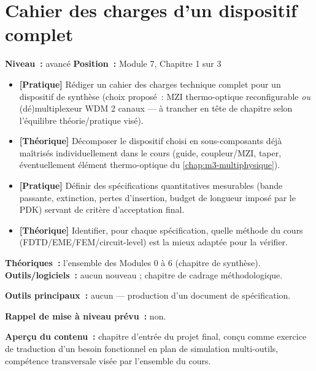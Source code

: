 
\chapter{Cahier des charges d'un dispositif complet}
\label{chap:m7-cahier-des-charges}

\noindent\textbf{Niveau~:} avancé \hfill \textbf{Position~:} Module 7, Chapitre 1 sur 3

\begin{objectifs}
\begin{itemize}[leftmargin=1.4em]
  \item \textbf{[Pratique]} Rédiger un cahier des charges technique complet pour un dispositif de synthèse (choix proposé~: MZI thermo-optique reconfigurable \emph{ou} (dé)multiplexeur WDM 2 canaux — à trancher en tête de chapitre selon l'équilibre théorie/pratique visé).
  \item \textbf{[Théorique]} Décomposer le dispositif choisi en sous-composants déjà maîtrisés individuellement dans le cours (guide, coupleur/MZI, taper, éventuellement élément thermo-optique du \cref{chap:m3-multiphysique}).
  \item \textbf{[Pratique]} Définir des spécifications quantitatives mesurables (bande passante, extinction, pertes d'insertion, budget de longueur imposé par le PDK) servant de critère d'acceptation final.
  \item \textbf{[Théorique]} Identifier, pour chaque spécification, quelle méthode du cours (FDTD/EME/FEM/circuit-level) est la mieux adaptée pour la vérifier.
\end{itemize}
\end{objectifs}

\begin{prerequis}
\textbf{Théoriques~:} l'ensemble des Modules 0 à 6 (chapitre de synthèse).\\
\textbf{Outils/logiciels~:} aucun nouveau ; chapitre de cadrage méthodologique.
\end{prerequis}

\noindent\textbf{Outils principaux~:} aucun — production d'un document de spécification.

\noindent\textbf{Rappel de mise à niveau prévu~:} non.

\noindent\textbf{Aperçu du contenu~:} chapitre d'entrée du projet final, conçu comme exercice de \og traduction\fg{} d'un besoin fonctionnel en plan de simulation multi-outils, compétence transversale visée par l'ensemble du cours.

